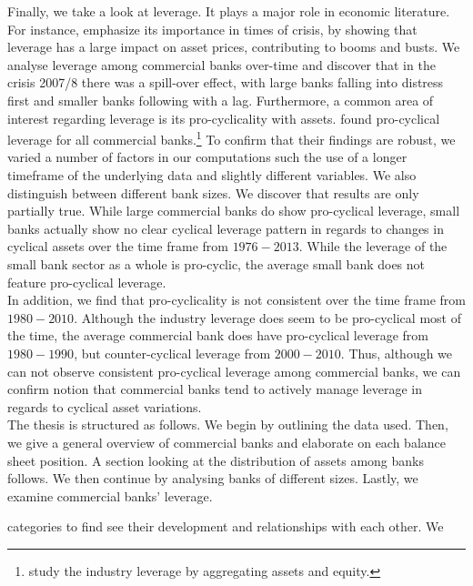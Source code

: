 \documentclass[12pt, a4paper]{article} %
\begin{document}
Finally, we take a look at leverage. It plays a major role in economic literature. For instance, \citet{geanakoplos2010leverage} emphasize its importance in times of crisis, by showing that leverage has a large impact on asset prices, contributing to booms and busts. We analyse leverage among commercial banks over-time and discover that in the crisis 2007/8 there was a spill-over effect, with large banks falling into distress first and smaller banks following with a lag.
Furthermore, a common area of interest regarding leverage is its pro-cyclicality with assets. \citet{AdrianShin2011} found pro-cyclical leverage for all commercial banks.\footnote{\citet{AdrianShin2011} study the industry leverage by aggregating assets and equity.} To confirm that their findings are robust, we varied a number of factors in our computations such the use of a longer timeframe of the underlying data and slightly different variables. We also distinguish between different bank sizes. We discover that \citet{AdrianShin2011} results are only partially true. While large commercial banks do show pro-cyclical leverage, small banks actually show no clear cyclical leverage pattern in regards to changes in cyclical assets over the time frame from $1976-2013$. While the leverage of the small bank sector as a whole is pro-cyclic, the average small bank does not feature pro-cyclical leverage.\\
In addition, we find that pro-cyclicality is not consistent over the time frame from $1980-2010$. Although the industry leverage does seem to be pro-cyclical most of the time, the average commercial bank does have pro-cyclical leverage from $1980-1990$, but counter-cyclical leverage from $2000-2010$. 
Thus, although we can not observe consistent pro-cyclical leverage among commercial banks, we can confirm \citet{AdrianShin2011} notion that commercial banks tend to actively manage leverage in regards to cyclical asset variations.\\
The thesis is structured as follows. We begin by outlining the data used. Then, we give a general overview of commercial banks and elaborate on each balance sheet position. A section looking at the distribution of assets among banks follows. We then continue by analysing banks of different sizes. Lastly, we examine commercial banks' leverage.

\iffalse
 categories to find see their development and relationships with each other. 
We 
\end{document}

